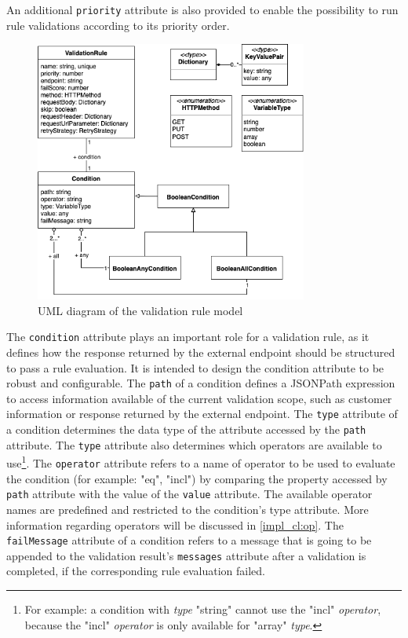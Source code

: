     An additional \verb;priority; attribute is also provided to enable the possibility to run rule validations according to its priority order.

    \begin{figure}[!ht]
      \includegraphics[width=0.8\textwidth]{diagrams/entity-validationrule.png}
      \caption{UML diagram of the validation rule model}
      \label{fig:uml_validation_rule}
    \end{figure}
    
    The \verb;condition; attribute plays an important role for a validation rule, as it defines how the response returned by the external endpoint should be structured to pass a rule evaluation. It is intended to design the condition attribute to be robust and configurable. The \verb;path; of a condition defines a JSONPath\autocite{Friesen2019} expression to access information available of the current validation scope, such as customer information or response returned by the external endpoint. The \verb;type; attribute of a condition determines the data type of the attribute accessed by the \verb;path; attribute. The \verb;type; attribute also determines which operators are available to use\footnote{For example: a condition with \emph{type} "string" cannot use the "incl" \emph{operator}, because the "incl" \emph{operator} is only available for "array" \emph{type}.}. The \verb;operator; attribute refers to a name of operator to be used to evaluate the condition (for example: "eq", "incl") by comparing the property accessed by \verb;path; attribute with the value of the \verb;value; attribute. The available operator names are predefined and restricted to the condition's type attribute. More information regarding operators will be discussed in \autoref{impl_cl:op}. The \verb;failMessage; attribute of a condition refers to a message that is going to be appended to the validation result's \verb;messages; attribute after a validation is completed, if the corresponding rule evaluation failed.


